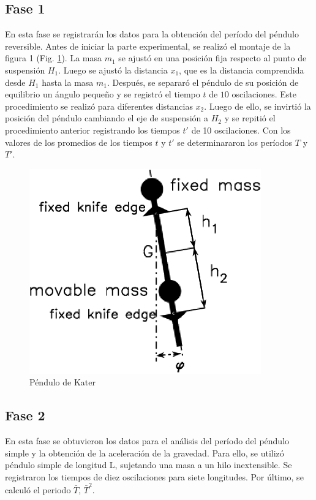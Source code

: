 \documentclass[spanish,notitlepage,letterpaper, 12pt]{article}
\begin{document}
\subsection{Fase 1}
En esta fase se registrarán los datos para la obtención del período del péndulo reversible. Antes de iniciar la parte experimental, se realizó el montaje de la figura 1 (Fig. \ref{Figura 3}). La masa $m_1$ se ajustó en una posición fija respecto al punto de suspensión $H_1$. Luego se ajustó la distancia $x_1$, que es la distancia comprendida desde $H_1$ hasta la masa $m_1$. Después, se separaró el péndulo de su posición de equilibrio un ángulo pequeño y se registró el tiempo $t$ de $10$ oscilaciones. Este procedimiento se realizó para diferentes distancias $x_2$.
Luego de ello, se invirtió la posición del péndulo cambiando el eje de suspensión a
$H_2$ y se repitió el procedimiento anterior registrando los tiempos $t\prime$ de 10 oscilaciones. Con los valores de los promedios de los tiempos $t$ y $t\prime$ se determinararon los
períodos $T$ y $T\prime$.
\begin{figure}[h]
    \centering
    \includegraphics[width=10.0cm]{images/Pendulo-Kater.png}
    \caption{Péndulo de Kater}
    \label{Figura 3}
\end{figure}
\subsection{Fase 2}
En esta fase se obtuvieron los datos para el análisis del período del péndulo simple y la obtención de la aceleración de la gravedad. Para ello, se utilizó péndulo simple de longitud L, sujetando una masa a un hilo inextensible. Se registraron los tiempos de diez oscilaciones para siete longitudes. Por último, se calculó el periodo $\bar{T}$, $\bar{T}^2$.
\end{document}

